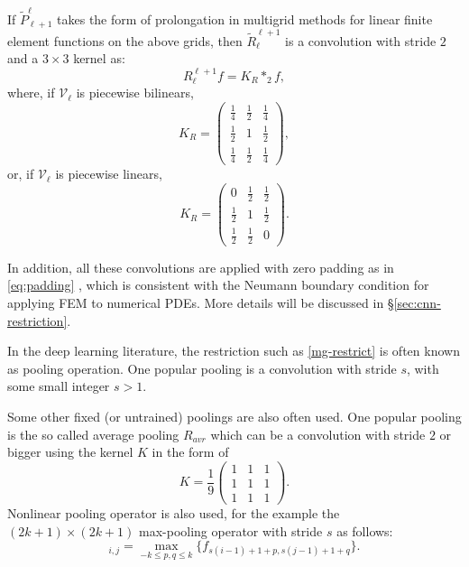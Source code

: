 \begin{lemma}
	If $\tilde P_{\ell+1}^\ell$ takes the form of prolongation
	in multigrid methods for linear finite element functions 
	on the above grids, then $\tilde R_{\ell}^{\ell+1}$ is 
	a convolution with stride $2$ and a $3\times3$
	kernel as:
	\begin{equation}\label{restriction}
	R_\ell^{\ell+1} f=K_R\ast_2 f,
	\end{equation} 
	where, if $\mathcal V_\ell$ is piecewise bilinears, 
	\begin{equation}\label{bi-restrict}
	K_R=
	\begin{pmatrix}
	\frac{1}{4} &\frac{1}{2}&\frac{1}{4}\\
	\frac{1}{2}& 1&\frac{1}{2}\\
	\frac{1}{4}&\frac{1}{2}&  \frac{1}{4} 
	\end{pmatrix},
	\end{equation}
	or, if $\mathcal V_\ell$ is piecewise linears, 
	\begin{equation}
	\label{linear-restrict}
	K_R=
	\begin{pmatrix}
	0 &\frac{1}{2}&\frac{1}{2}\\
	\frac{1}{2}& 1&\frac{1}{2}\\
	\frac{1}{2}&\frac{1}{2}&  0
	\end{pmatrix}.
	\end{equation}
\end{lemma} 
In addition, all these convolutions are applied with zero padding as in \eqref{eq:padding}
, which is consistent with the Neumann boundary condition for applying FEM to 
numerical PDEs. More details will be discussed in \S \ref{sec:cnn-restriction}.

In the deep learning literature, the restriction such as
\eqref{mg-restrict} is often known as pooling operation.  One popular
pooling is a convolution with stride $s$, with some small integer $s>1$.  

Some other fixed (or untrained) poolings are also often used.  
One popular pooling is the so called average pooling $R_{avr}$ which
can be a convolution with stride $2$ or bigger using the  kernel $K$
in the form of
\begin{equation}
\label{average-K}
K=
\frac{1}{9}\begin{pmatrix}
1 & 1 & 1 \\
1 & 1 & 1 \\
1 & 1 & 1
\end{pmatrix}. 
\end{equation}
Nonlinear pooling operator is also used, for the example the $(2k+1)
\times (2k+1)$ max-pooling operator with stride $s$ as follows:
\begin{equation}
[{R}_{\rm max}(f)]_{i,j} = \max_{-k\le p ,q\le k} \{f_{s(i-1)+1 + p, s(j-1)+1 +q} \}.
\end{equation}

